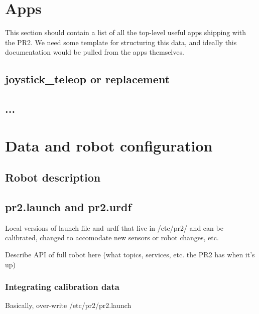 \section{Apps}
This section should contain a list of all the top-level useful apps shipping with the PR2.  We need some template for structuring this data, and ideally this documentation would be pulled from the apps themselves.

\subsection{joystick\_teleop or replacement}
\subsection{...}
\section{Data and robot configuration}
\subsection{Robot description}
\subsection{pr2.launch and pr2.urdf}
Local versions of launch file and urdf that live in /etc/pr2/ and can be calibrated, changed to accomodate new sensors or robot changes, etc.

Describe API of full robot here (what topics, services, etc. the PR2 has when it's up)
\subsubsection{Integrating calibration data}
Basically, over-write /etc/pr2/pr2.launch
